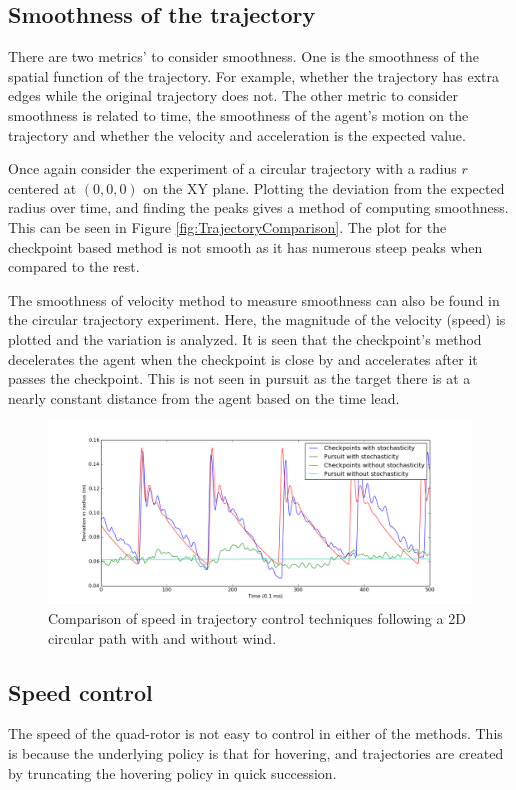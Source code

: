 \documentclass[hidelinks,BTech]{iitmdiss}
\begin{document}
\subsection{Smoothness of the trajectory}
There are two metrics' to consider smoothness. One is the smoothness of the spatial function of the trajectory. For example, whether the trajectory has extra edges while the original trajectory does not. The other metric to consider smoothness is related to time, the smoothness of the agent's motion on the trajectory and whether the velocity and acceleration is the expected value.

Once again consider the experiment of a circular trajectory with a radius $r$ centered at $(0,0,0)$ on the XY plane. Plotting the deviation from the expected radius over time, and finding the peaks gives a method of computing smoothness. This can be seen in Figure \ref{fig:TrajectoryComparison}. The plot for the checkpoint based method is not smooth as it has numerous steep peaks when compared to the rest.

The smoothness of velocity method to measure smoothness can also be found in the circular trajectory experiment. Here, the magnitude of the velocity (speed) is plotted and the variation is analyzed. It is seen that the checkpoint's method decelerates the agent when the checkpoint is close by and accelerates after it passes the checkpoint. This is not seen in pursuit as the target there is at a nearly constant distance from the agent based on the time lead.

\begin{figure}[H]
  \centering
    \includegraphics[width=\textwidth]{comparison_velocity.png}
    \caption{Comparison of speed in trajectory control techniques following a 2D circular path with and without wind.}
\end{figure}

\subsection{Speed control}
The speed of the quad-rotor is not easy to control in either of the methods. This is because the underlying policy is that for hovering, and trajectories are created by truncating the hovering policy in quick succession.
\end{document}

